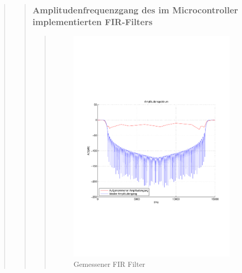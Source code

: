 \begin{quote}
\begin{quote}
        \subsubsection{Amplitudenfrequenzgang des im Microcontroller
        implementierten FIR-Filters}
    	\begin{quote}
            \begin{figure}[H]
            \centering
                \includegraphics[scale=0.7, trim = 1.5cm 6.5cm 1cm 7.5cm, clip]{./Bilder/gemessener_FIR_Filter}
                    \caption{Gemessener FIR Filter}
            \end{figure}
            

\end{quote}
\end{quote}
\end{quote}
